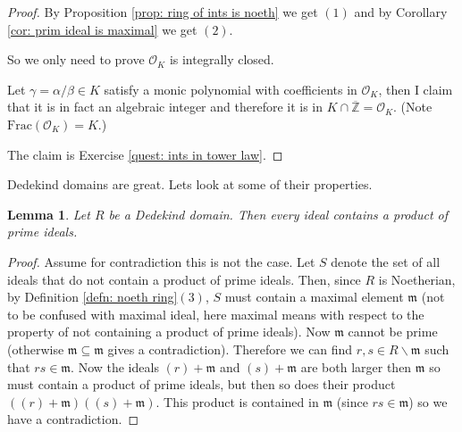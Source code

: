 \documentclass[11pt,a4paper]{report}
\theoremstyle{plain}
\newtheorem{lem}[subsection]{Lemma}
\theoremstyle{definition}
\theoremstyle{definition}
\newcommand{\ZZ}{\mathbb{Z}}
\def\gothm{\mathfrak{m}}
\def \a{\alpha}
\def \g {\gamma}
\def \OO {\mathcal{O}}
\def \ov{\overline}
\begin{document}
\begin{proof}

By 	Proposition \ref{prop: ring of ints is noeth} we get $(1)$ and by Corollary \ref{cor: prim ideal is maximal} we get $(2)$.

So we only need to prove $\OO_K$ is integrally closed. 

Let $\gamma=\a / \beta \in K$ satisfy a monic polynomial with coefficients in $\OO_K$, then I claim that it is in fact an algebraic integer and therefore it is in $K \cap \ov{\ZZ}=\OO_K$. (Note $\mathrm{Frac}(\OO_K)=K$.) 

The claim is Exercise \ref{quest: ints in tower law}.








\end{proof}

Dedekind domains are great. Lets look at some of their properties.


\begin{lem}\label{lem: ded dom ideal has prim ideals}
Let $R$ be a Dedekind domain. Then every ideal contains a product of prime ideals.
\end{lem}

\begin{proof}
Assume for contradiction this is not the case. Let $S$ denote the set of all ideals that do not contain a product of prime ideals. Then, since $R$ is Noetherian, by Definition \ref{defn: noeth ring}$(3)$, $S$ must contain a maximal element $\gothm$ (not to be confused with maximal ideal, here maximal means with respect to the property of not containing a product of prime ideals). Now $\gothm$ cannot be prime (otherwise $\gothm \subseteq \gothm$ gives a contradiction). Therefore we can find $r,s \in R \backslash \gothm$ such that $rs \in \gothm$. Now the ideals $(r)+\gothm$ and $(s)+\gothm$ are both larger then $\gothm$ so must contain a product of prime ideals, but then so does their product $((r)+\gothm)((s)+\gothm)$. This product is contained in $\gothm$ (since $rs \in \gothm$) so we have a contradiction.
\end{proof}
\end{document}
